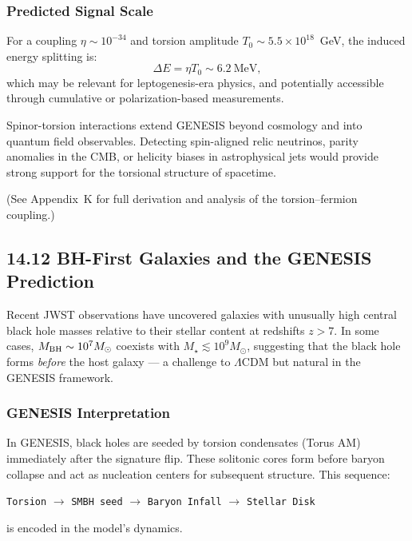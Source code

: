 \documentclass{article}
\begin{document}
\subsubsection*{Predicted Signal Scale}
For a coupling $\eta \sim 10^{-34}$ and torsion amplitude $T_0 \sim 5.5 \times 10^{18}$~GeV, the induced energy splitting is:
\begin{equation}
\Delta E = \eta T_0 \sim 6.2~\text{MeV},
\end{equation}
which may be relevant for leptogenesis-era physics, and potentially accessible through cumulative or polarization-based measurements.

\begin{tcolorbox}[colback=gray!5, colframe=black!30, title=Why this matters]
Spinor-torsion interactions extend GENESIS beyond cosmology and into quantum field observables. Detecting spin-aligned relic neutrinos, parity anomalies in the CMB, or helicity biases in astrophysical jets would provide strong support for the torsional structure of spacetime.
\end{tcolorbox}

(See Appendix~K for full derivation and analysis of the torsion–fermion coupling.)

\subsection*{14.12 BH-First Galaxies and the GENESIS Prediction}
\label{sec:bh_first}

Recent JWST observations have uncovered galaxies with unusually high central black hole masses relative to their stellar content at redshifts $z > 7$. In some cases, $M_{\rm BH} \sim 10^7 M_\odot$ coexists with $M_\star \lesssim 10^9 M_\odot$, suggesting that the black hole forms \emph{before} the host galaxy --- a challenge to $\Lambda$CDM but natural in the GENESIS framework.

\subsubsection*{GENESIS Interpretation}
In GENESIS, black holes are seeded by torsion condensates (Torus AM) immediately after the signature flip. These solitonic cores form before baryon collapse and act as nucleation centers for subsequent structure. This sequence:
\begin{center}
\texttt{Torsion} $\rightarrow$ \texttt{SMBH seed} $\rightarrow$ \texttt{Baryon Infall} $\rightarrow$ \texttt{Stellar Disk}
\end{center}
is encoded in the model's dynamics.
\end{document}
